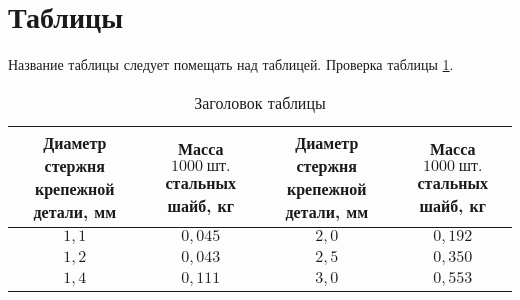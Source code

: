 \section{Таблицы}
Название таблицы следует помещать над таблицей. Проверка
таблицы \ref{t:1}.

\begin{table}[h]
\caption{Заголовок таблицы}
\label{t:1}
\begin{tabular}{|c|c|c|c|}
\hline
\multicolumn{1}{|p{4cm}|}{Диаметр стержня крепежной детали, мм}&
\multicolumn{1}{p{4cm}|}{Масса $1000~\text{шт.}$ стальных шайб, кг}&
\multicolumn{1}{p{4cm}|}{Диаметр стержня крепежной детали, мм}&
\multicolumn{1}{p{4cm}|}{Масса $1000~\text{шт.}$ стальных шайб,
кг}\\\hline
$1{,}1$ & $0{,}045$ & $2{,}0$ & $0{,}192$\\\hline
$1{,}2$ & $0{,}043$ & $2{,}5$ & $0{,}350$\\\hline
$1{,}4$ & $0{,}111$ & $3{,}0$ & $0{,}553$\\\hline
\end{tabular}
\end{table}